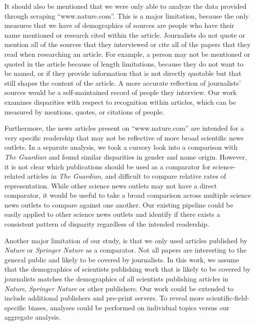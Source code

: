 It should also be mentioned that we were only able to analyze the data provided through scraping ``www.nature.com''.
This is a major limitation, because the only measures that we have of demographics of sources are people who have their name mentioned or research cited within the article.
Journalists do not quote or mention all of the sources that they interviewed or cite all of the papers that they read when researching an article.
For example, a person may not be mentioned or quoted in the article because of length limitations, because they do not want to be named, or if they provide information that is not directly quotable but that still shapes the content of the article.
A more accurate reflection of journalists' sources would be a self-maintained record of people they interview.
Our work examines disparities with respect to recognition within articles, which can be measured by mentions, quotes, or citations of people.

Furthermore, the news articles present on ``www.nature.com'' are intended for a very specific readership that may not be reflective of more broad scientific news outlets.
In a separate analysis, we took a cursory look into a comparison with \emph{The Guardian} and found similar disparities in gender and name origin.
However, it is not clear which publications should be used as a comparator for science-related articles in \emph{The Guardian}, and difficult to compare relative rates of representation.
While other science news outlets may not have a direct comparator, it would be useful to take a broad comparison across multiple science news outlets to compare against one another.
Our existing pipeline could be easily applied to other science news outlets and identify if there exists a consistent pattern of disparity regardless of the intended readership.

Another major limitation of our study, is that we only used articles published by \emph{Nature} or \emph{Springer Nature} as a comparator.
Not all papers are interesting to the general public and likely to be covered by journalists.
In this work, we assume that the demographics of scientists publishing work that is likely to be covered by journalists matches the demographics of all scientists publishing articles in \emph{Nature}, \emph{Springer Nature} or other publishers.
Our work could be extended to include additional publishers and pre-print servers.
To reveal more scientific-field-specific biases, analyses could be performed on individual topics versus our aggregate analysis.

